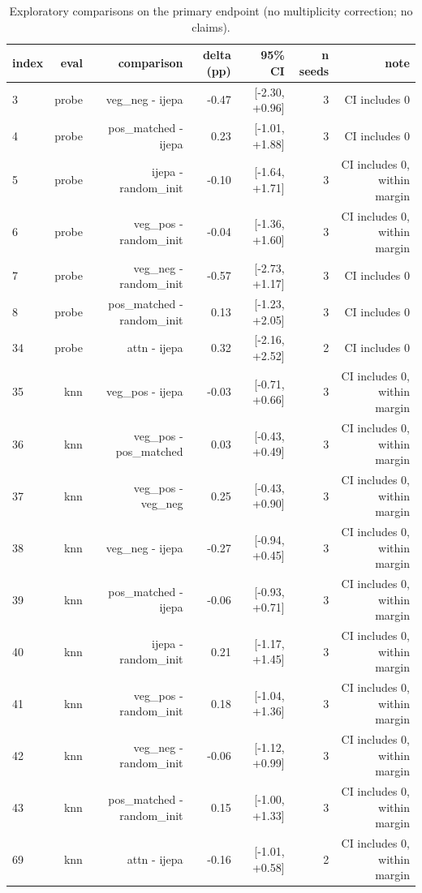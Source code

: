 \begin{table}[t]
\centering
\small
\caption{Exploratory comparisons on the primary endpoint (no multiplicity correction; no claims).}
\label{tab:exploratory_comparisons}
\begin{tabular}{lrrrrrr}
\toprule
index & eval & comparison & delta (pp) & 95\% CI & n seeds & note \\
\midrule
3 & probe & veg\_neg - ijepa & -0.47 & [-2.30, +0.96] & 3 & CI includes 0 \\
4 & probe & pos\_matched - ijepa & 0.23 & [-1.01, +1.88] & 3 & CI includes 0 \\
5 & probe & ijepa - random\_init & -0.10 & [-1.64, +1.71] & 3 & CI includes 0, within margin \\
6 & probe & veg\_pos - random\_init & -0.04 & [-1.36, +1.60] & 3 & CI includes 0, within margin \\
7 & probe & veg\_neg - random\_init & -0.57 & [-2.73, +1.17] & 3 & CI includes 0 \\
8 & probe & pos\_matched - random\_init & 0.13 & [-1.23, +2.05] & 3 & CI includes 0 \\
34 & probe & attn - ijepa & 0.32 & [-2.16, +2.52] & 2 & CI includes 0 \\
35 & knn & veg\_pos - ijepa & -0.03 & [-0.71, +0.66] & 3 & CI includes 0, within margin \\
36 & knn & veg\_pos - pos\_matched & 0.03 & [-0.43, +0.49] & 3 & CI includes 0, within margin \\
37 & knn & veg\_pos - veg\_neg & 0.25 & [-0.43, +0.90] & 3 & CI includes 0, within margin \\
38 & knn & veg\_neg - ijepa & -0.27 & [-0.94, +0.45] & 3 & CI includes 0, within margin \\
39 & knn & pos\_matched - ijepa & -0.06 & [-0.93, +0.71] & 3 & CI includes 0, within margin \\
40 & knn & ijepa - random\_init & 0.21 & [-1.17, +1.45] & 3 & CI includes 0, within margin \\
41 & knn & veg\_pos - random\_init & 0.18 & [-1.04, +1.36] & 3 & CI includes 0, within margin \\
42 & knn & veg\_neg - random\_init & -0.06 & [-1.12, +0.99] & 3 & CI includes 0, within margin \\
43 & knn & pos\_matched - random\_init & 0.15 & [-1.00, +1.33] & 3 & CI includes 0, within margin \\
69 & knn & attn - ijepa & -0.16 & [-1.01, +0.58] & 2 & CI includes 0, within margin \\
\bottomrule
\end{tabular}
\end{table}
